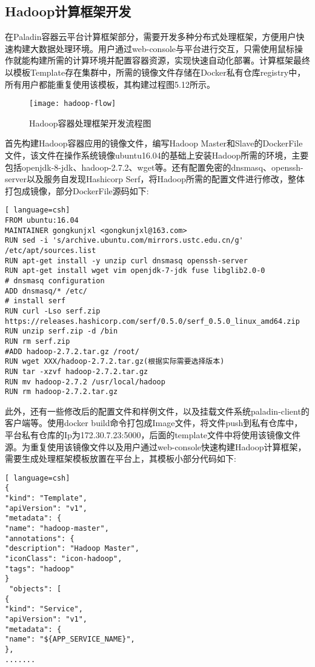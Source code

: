 \subsection{Hadoop计算框架开发}
在Paladin容器云平台计算框架部分，需要开发多种分布式处理框架，方便用户快速构建大数据处理环境。用户通过web-console与平台进行交互，只需使用鼠标操作就能构建所需的计算环境并配置容器资源，实现快速自动化部署。计算框架最终以模板Template存在集群中，所需的镜像文件存储在Docker私有仓库registry中，所有用户都能重复使用该模板，其构建过程图5.12所示。
\begin{figure}[H] %
	\centering
	\texttt{[image: hadoop-flow]}
	\caption{Hadoop容器处理框架开发流程图}
\end{figure}

首先构建Hadoop容器应用的镜像文件，编写Hadoop Master和Slave的DockerFile文件，该文件在操作系统镜像ubuntu16.04的基础上安装Hadoop所需的环境，主要包括openjdk-8-jdk、hadoop-2.7.2、wget等。还有配置免密的dnsmasq、openssh-server以及服务自发现Hashicorp Serf，将Hadoop所需的配置文件进行修改，整体打包成镜像，部分DockerFile源码如下:
\begin{lstlisting}[ language=csh]
FROM ubuntu:16.04
MAINTAINER gongkunjxl <gongkunjxl@163.com>
RUN sed -i 's/archive.ubuntu.com/mirrors.ustc.edu.cn/g' /etc/apt/sources.list
RUN apt-get install -y unzip curl dnsmasq openssh-server
RUN apt-get install wget vim openjdk-7-jdk fuse libglib2.0-0
# dnsmasq configuration
ADD dnsmasq/* /etc/
# install serf
RUN curl -Lso serf.zip https://releases.hashicorp.com/serf/0.5.0/serf_0.5.0_linux_amd64.zip
RUN unzip serf.zip -d /bin 
RUN rm serf.zip
#ADD hadoop-2.7.2.tar.gz /root/
RUN wget XXX/hadoop-2.7.2.tar.gz(根据实际需要选择版本)
RUN tar -xzvf hadoop-2.7.2.tar.gz
RUN mv hadoop-2.7.2 /usr/local/hadoop
RUN rm hadoop-2.7.2.tar.gz
\end{lstlisting}

此外，还有一些修改后的配置文件和样例文件，以及挂载文件系统paladin-client的客户端等。使用docker build命令打包成Image文件，将文件push到私有仓库中，平台私有仓库的Ip为172.30.7.23:5000，后面的template文件中将使用该镜像文件源。为重复使用该镜像文件以及用户通过web-console快速构建Hadoop计算框架，需要生成处理框架模板放置在平台上，其模板小部分代码如下:
\begin{lstlisting}[ language=csh]
{
"kind": "Template",
"apiVersion": "v1",
"metadata": {
"name": "hadoop-master",
"annotations": {
"description": "Hadoop Master",
"iconClass": "icon-hadoop",
"tags": "hadoop"
}
 "objects": [
{
"kind": "Service",
"apiVersion": "v1",
"metadata": {
"name": "${APP_SERVICE_NAME}",
},
.......
\end{lstlisting}

